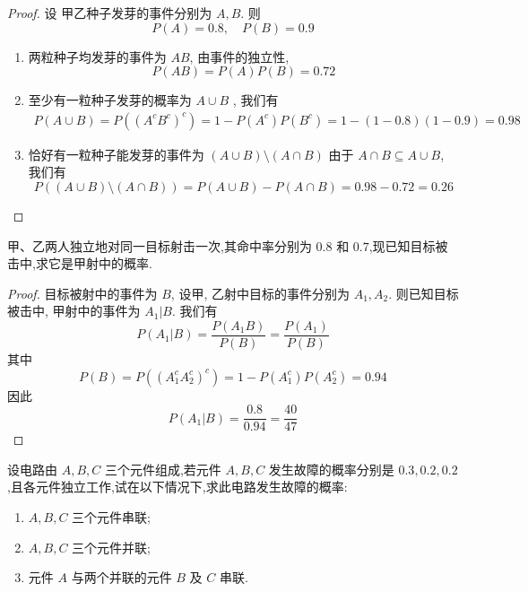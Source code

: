 \documentclass[../main.tex]{subfiles}
\begin{document}
\begin{proof}
    设 甲乙种子发芽的事件分别为 \(  A,B  \). 则 \[
    P\left( A \right)= 0.8,\quad P\left( B \right)= 0.9  
    \]
    \begin{enumerate}
        \item 两粒种子均发芽的事件为 \(  AB  \), 由事件的独立性,  \[
        P\left( AB \right)= P\left( A \right)P\left( B \right)= 0.72   
        \]
        \item 至少有一粒种子发芽的概率为 \(  A\cup B  \)  , 我们有 \[
        \begin{aligned}
        P\left( A\cup B \right)= P\left( \left( A^{c}B^{c} \right)^{c}  \right)= 1- P\left( A^{c} \right)P\left( B^{c} \right)= 1-\left( 1-0.8 \right)\left( 1-0.9 \right)= 0.98       
        \end{aligned}
        \]
        \item 恰好有一粒种子能发芽的事件为 \(  \left( A\cup B \right)\setminus \left( A\cap B \right)    \) 由于 \(  A\cap B\subseteq A\cup B  \), 我们有 \[
        P\left( \left( A\cup B \right)\setminus \left( A\cap B \right)   \right)= P\left( A\cup B \right)-P\left( A\cap B \right)= 0.98-0.72= 0.26   
        \] 
    \end{enumerate}
     
\end{proof}
\begin{exercise}{}{}
甲、乙两人独立地对同一目标射击一次,其命中率分别为 $0.8$ 和 $0.7$,现已知目标被击中,求它是甲射中的概率.
\end{exercise}
\begin{proof}
    目标被射中的事件为 \(  B  \), 设甲, 乙射中目标的事件分别为 \(  A_1,A_2  \). 则已知目标被击中, 甲射中的事件为 \(  A_1|B  \). 我们有 \[
    P\left( A_1|B \right)= \frac{P\left( A_1B \right)  }{P\left( B \right)  }  = \frac{P\left( A_1 \right)  }{P\left( B \right)  } 
    \]其中 \[
    P\left( B \right)= P\left( \left( A_1^{c}A_2^{c} \right)^{c}  \right)= 1-P\left( A_1^{c} \right)P\left( A_2^{c} \right)= 0.94    
    \]因此 \[
    P\left( A_1|B \right)= \frac{ 0.8}{0.94 }= \frac{40 }{47 }   
    \]
\end{proof}
\begin{exercise}{}{}
设电路由 $A,B,C$ 三个元件组成,若元件 $A,B,C$ 发生故障的概率分别是 $0.3,0.2,0.2$,且各元件独立工作,试在以下情况下,求此电路发生故障的概率:
\begin{enumerate}
    \item $A,B,C$ 三个元件串联;
    \item $A,B,C$ 三个元件并联;
    \item 元件 $A$ 与两个并联的元件 $B$ 及 $C$ 串联.
\end{enumerate}
\end{exercise}
\end{document}
